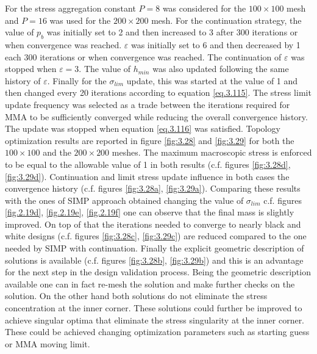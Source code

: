 For the stress aggregation constant  $P=8$ was considered for the $100\times100$ mesh and $P=16$ was used for the $200\times200$ mesh.
For the continuation strategy, the value of $p_b$ was initially set to 2 and then increased to 3 after 300 iterations or when convergence was reached. $\varepsilon$ was initially set to 6 and then decreased by 1 each 300 iterations or when convergence was reached.  The continuation of $\varepsilon$ was stopped when $\varepsilon=3$. The value of $h_{min}$ was also updated following the same history of $\varepsilon$. Finally for the $\sigma_{lim}$ update, this was started at the value of 1 and then changed every 20 iterations according to equation \eqref{eq.3.115}. The stress limit update frequency was selected as a trade between the iterations required for MMA to be sufficiently converged while reducing the overall convergence history. The update was stopped when equation \eqref{eq.3.116} was satisfied. Topology optimization results are reported in figure \ref{fig:3.28} and \ref{fig:3.29} for both the $100\times100$ and the $200\times200$ meshes. The maximum macroscopic stress is enforced to be equal to the allowable value of 1 in both results (c.f. figures \ref{fig:3.28d}, \ref{fig:3.29d}). Continuation and limit stress update influence in both cases the convergence history (c.f. figures \ref{fig:3.28a}, \ref{fig:3.29a}).  Comparing these results with the ones of SIMP approach obtained changing the value of $\sigma_{lim}$ c.f. figures \ref{fig.2.19d}, \ref{fig.2.19e}, \ref{fig.2.19f} one can observe that the final mass is slightly improved.  
 On top of that the iterations needed to converge to nearly black and white designs  (c.f. figures \ref{fig:3.28c}, \ref{fig:3.29c}) are reduced compared to the one needed by SIMP with continuation. Finally the explicit geometric description of solutions is available (c.f. figures \ref{fig:3.28b}, \ref{fig:3.29b}) and this is an advantage for the next step in the design validation process. Being the geometric description available one can in fact re-mesh the solution and make further checks on the solution.
 On the other hand both solutions do not eliminate the stress concentration at the inner corner. These solutions could further be improved to achieve singular optima that eliminate the stress singularity at the inner corner. These could be achieved changing optimization parameters such as starting guess or MMA moving limit. 

